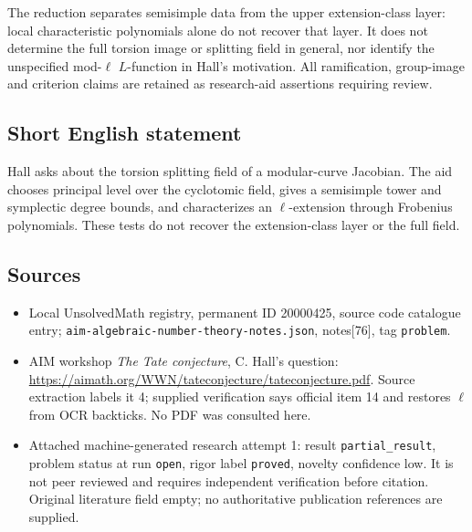 \documentclass[11pt]{article}
\begin{document}
The reduction separates semisimple data from the upper extension-class layer: local characteristic polynomials alone do not recover that layer. It does not determine the full torsion image or splitting field in general, nor identify the unspecified mod-$\ell$ $L$-function in Hall's motivation. All ramification, group-image and criterion claims are retained as research-aid assertions requiring review.
\subsection{Short English statement}
Hall asks about the torsion splitting field of a modular-curve Jacobian. The aid chooses principal level over the cyclotomic field, gives a semisimple tower and symplectic degree bounds, and characterizes an $\ell$-extension through Frobenius polynomials. These tests do not recover the extension-class layer or the full field.
\subsection{Sources}
\begin{itemize}
\item Local UnsolvedMath registry, permanent ID 20000425, source code catalogue entry; \texttt{aim-algebraic-number-theory-notes.json}, notes[76], tag \texttt{problem}.
\item AIM workshop \emph{The Tate conjecture}, C. Hall's question: \url{https://aimath.org/WWN/tateconjecture/tateconjecture.pdf}. Source extraction labels it 4; supplied verification says official item 14 and restores $\ell$ from OCR backticks. No PDF was consulted here.
\item Attached machine-generated research attempt 1: result \texttt{partial\_result}, problem status at run \texttt{open}, rigor label \texttt{proved}, novelty confidence low. It is not peer reviewed and requires independent verification before citation. Original literature field empty; no authoritative publication references are supplied.
\end{itemize}
\end{document}
